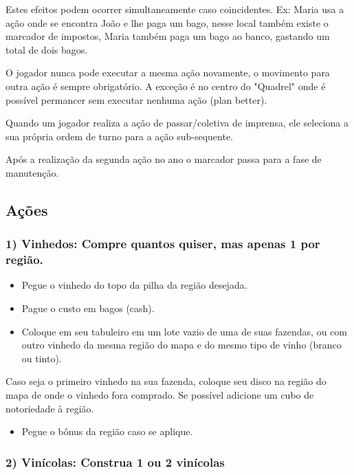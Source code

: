 \documentclass[11pt]{article}
\begin{document}
Estes efeitos podem ocorrer simultaneamente caso coincidentes.
Ex: Maria usa a ação onde se encontra João e lhe paga um bago, nesse local também existe o marcador de impostos, Maria também paga um bago ao banco, gastando um total de dois bagos.

O jogador nunca pode executar a mesma ação novamente, o movimento para outra ação é sempre obrigatório. A exceção é no centro do "Quadrel" onde é possível permancer sem executar nenhuma ação (plan better).

Quando um jogador realiza a ação de passar/coletiva de imprensa, ele seleciona a sua própria ordem de turno para a ação sub-sequente.

Após a realização da segunda ação no ano o marcador passa para a fase de manutenção.

\subsection{Ações}
\label{sec:org64824cc}

\subsubsection{1) Vinhedos: Compre quantos quiser, mas apenas 1 por região.}
\label{sec:orgcc63c49}

\begin{itemize}
\item Pegue o vinhedo do topo da pilha da região desejada.
\item Pague o custo em bagos (cash).
\item Coloque em seu tabuleiro em um lote vazio de uma de suas fazendas, ou com outro vinhedo da mesma região do mapa e do mesmo tipo de vinho (branco ou tinto).
\end{itemize}

Caso seja o primeiro vinhedo na sua fazenda, coloque seu disco na região do mapa de onde o vinhedo fora comprado. Se possível adicione um cubo de notoriedade à região.

\begin{itemize}
\item Pegue o bônus da região caso se aplique.
\end{itemize}

\subsubsection{2) Vinícolas: Construa 1 ou 2 vinícolas}
\label{sec:org1043e3e}
\end{document}
